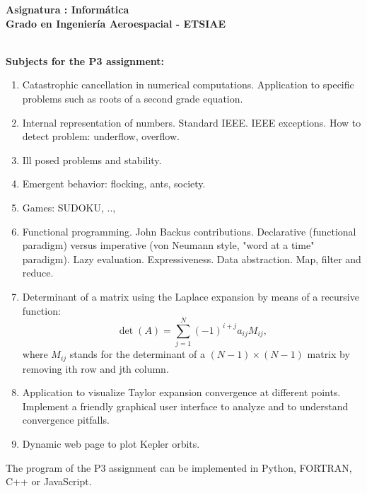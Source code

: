 \documentclass[12pt,spanish]{article}
\begin{document}
\begin{center}
	{\bf \Large Asignatura : 
	Informática}                                               
	\\ \vspace{1cm}
	{\bf \Large Grado en Ingeniería Aeroespacial - 
	ETSIAE}                                            \\
	               \\
\end{center}

\vspace{1cm}

\noindent
{\bf \Large Subjects for the P3 assignment: 
}                                                                               
     
\vspace{0.5cm}

\begin{enumerate}

\item Catastrophic cancellation in numerical computations. Application to 
specific problems such as roots of a second grade equation. 

\item Internal representation of numbers. Standard IEEE. IEEE exceptions. 
How to detect problem: underflow, overflow. 

\item Ill posed problems and stability. 


\item Emergent behavior: flocking, ants, society. 
\item Games: SUDOKU, ..,
\item Functional programming. John Backus contributions. Declarative 
(functional paradigm) versus imperative (von Neumann style, "word at a time" 
paradigm). Lazy evaluation. Expressiveness. Data abstraction. Map, filter and 
reduce. 

\item Determinant of a matrix using the Laplace expansion by means of a 
recursive function:  
$$ 
   \det(A) = \sum _{j=1} ^N (-1)^{i+j} a_{ij} M_{ij}, 
$$
where $ M_{ij} $ stands for the determinant of a $ (N-1) \times (N-1) $ matrix 
by removing ith row and jth column. 

\item Application to visualize Taylor expansion convergence at different 
points. Implement a friendly graphical user interface to analyze and to 
understand convergence pitfalls. 

\item Dynamic web page to plot Kepler orbits. 
 
\end{enumerate}
The program of the  P3 assignment can be implemented in Python, FORTRAN, C++ or JavaScript. 
\end{document}
